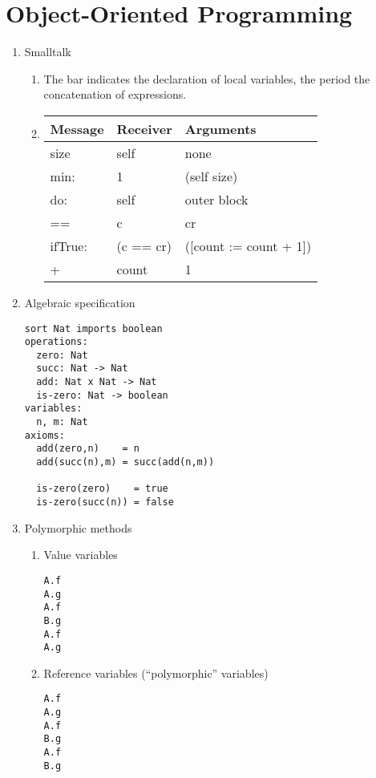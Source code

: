 \documentclass{article}
\begin{document}
\section*{Object-Oriented Programming}
\begin{enumerate}
\item Smalltalk
\begin{enumerate}
\item The bar indicates the declaration of local variables, the period the
concatenation of expressions.
\item 

\begin{tabular}{lll}
Message & Receiver & Arguments \\ \hline
size    & self     & none \\
min:    & 1        & (self size) \\
do:     & self     & outer block \\
==      & c        & cr \\
ifTrue: & (c == cr) & ([count := count + 1]) \\
+       & count     & 1 \\
\end{tabular}
\end{enumerate}
\item Algebraic specification
\begin{verbatim}
sort Nat imports boolean
operations:
  zero: Nat
  succ: Nat -> Nat
  add: Nat x Nat -> Nat
  is-zero: Nat -> boolean
variables:
  n, m: Nat
axioms:
  add(zero,n)    = n
  add(succ(n),m) = succ(add(n,m))

  is-zero(zero)    = true
  is-zero(succ(n)) = false
\end{verbatim}
\item Polymorphic methods
\begin{enumerate}
\item Value variables
{\small
\begin{verbatim}
A.f
A.g
A.f
B.g
A.f
A.g
\end{verbatim}
}
\item Reference variables (``polymorphic'' variables)
{\small
\begin{verbatim}
A.f
A.g
A.f
B.g
A.f
B.g
\end{verbatim}
}
\end{enumerate} 
\end{enumerate}
\end{document}
